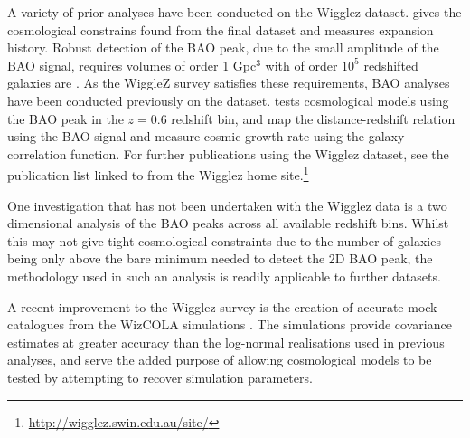 \documentclass[titlesmallcaps, examinerscopy, copyrightpage]{uqthesis}
\begin{document}
A variety of prior analyses have been conducted on the Wigglez dataset.  \citet{Parkinson2012} gives the cosmological constrains found from the final dataset and \citet{BlakeGlazebrook2011} measures expansion history. Robust detection of the BAO peak, due to the small amplitude of the BAO signal, requires volumes of order 1 Gpc$^3$ with of order $10^5$ redshifted galaxies are \citep{Tegmark1997,BlakeGlazebrook2003,BlakeParkinson2006}. As the WiggleZ survey satisfies these requirements, BAO analyses have been conducted previously on the dataset. \citet{BlakeDavis2011} tests cosmological models using the BAO peak in the $z=0.6$ redshift bin, \citet{BlakeKazin2011} and \citet{KazinKoda2014} map the distance-redshift relation using the BAO signal and \citet{ContrerasBlake2013} measure cosmic growth rate using the galaxy correlation function. For further publications using the Wigglez dataset, see the publication list linked to from the Wigglez home site.\footnote{\url{http://wigglez.swin.edu.au/site/}}



One investigation that has not been undertaken with the Wigglez data is a two dimensional analysis of the BAO peaks across all available redshift bins. Whilst this may not give tight cosmological constraints due to the number of galaxies being only above the bare minimum needed to detect the 2D BAO peak, the methodology used in such an analysis is readily applicable to further datasets.

A recent improvement to the Wigglez survey is the creation of accurate mock catalogues from the WizCOLA simulations \citep{KodaBlake2015}. The simulations provide covariance estimates at greater accuracy than the log-normal realisations used in previous analyses, and serve the added purpose of allowing cosmological models to be tested by attempting to recover simulation parameters.
\end{document}

